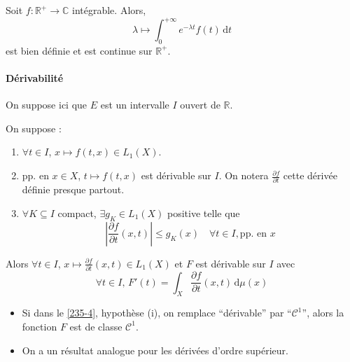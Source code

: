 
  \begin{example}
    Soit $f : \mathbb{R}^+ \rightarrow \mathbb{C}$ intégrable. Alors,
    \[ \lambda \mapsto \int_0^{+\infty} e^{-\lambda t} f(t) \, \mathrm{d}t \]
    est bien définie et est continue sur $\mathbb{R}^+$.
  \end{example}

  \paragraph{Dérivabilité}


  On suppose ici que $E$ est un intervalle $I$ ouvert de $\mathbb{R}$.

  \begin{theorem}
    \label{235-4}
    On suppose :
    \begin{enumerate}[label=(\roman*)]
      \item $\forall t \in I$, $x \mapsto f(t,x) \in L_1(X)$.
      \item pp. en $x \in X$, $t \mapsto f(t,x)$ est dérivable sur $I$. On notera $\frac{\partial f}{\partial t}$ cette dérivée définie presque partout.
      \item $\forall K \subseteq I$ compact, $\exists g_K \in L_1(X)$ positive telle que
      \[ \left| \frac{\partial f}{\partial t}(x,t) \right| \leq g_K(x) \quad \forall t \in I, \text{pp. en } x \]
    \end{enumerate}
    Alors $\forall t \in I$, $x \mapsto \frac{\partial f}{\partial t}(x, t) \in L_1(X)$ et $F$ est dérivable sur $I$ avec
    \[ \forall t \in I, \, F'(t) = \int_X \frac{\partial f}{\partial t}(x, t) \, \mathrm{d}\mu(x) \]
  \end{theorem}

  \begin{remark}
    \begin{itemize}
      \item Si dans le \cref{235-4}, hypothèse (i), on remplace ``dérivable'' par ``$\mathcal{C}^1$'', alors la fonction $F$ est de classe $\mathcal{C}^1$.
      \item On a un résultat analogue pour les dérivées d'ordre supérieur.
    \end{itemize}
  \end{remark}

